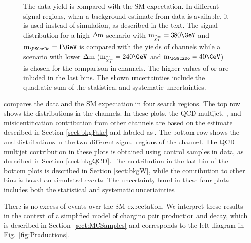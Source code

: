 \begin{figure}[!htb]
\caption{The data yield is compared with the SM expectation. In different signal regions, 
when a background estimate from data is available, it is used instead of simulation, as described in the text. The signal distribution for a high $\Delta \rm{m}$ scenario with $\rm{m}_{\chione}=380\GeV$ and $\rm{m}_{\PSGczDo}=1\GeV$ is compared with the yields of \leptonTau channels while a scenario with lower $\Delta \rm{m}$ ($\rm{m}_{\chione}=240\GeV$ and $\rm{m}_{\PSGczDo}=40\GeV$) is chosen for the comparison in \tauTau channels. The higher values of \mttwo or \SumMT are inluded in the last bins. The shown uncertainties include the quadratic sum of the statistical and systematic uncertainties.}
\label{fig:yield_final}
\end{figure}
compares the data and the SM expectation in four search regions. The top row 
shows the \mttwo distributions in the \leptonTau channels. 
In these plots, the QCD multijet, \wjets, and misidentification \Tau contribution from other channels 
are based on the estimate described in Section \ref{sect:bkgFake} and labeled as \wjets.
The bottom row shows the \mttwo and \SumMT distributions in the two different signal regions of the \tauTau channel. 
The QCD multijet contribution in these plots is obtained using control samples in data, as described in 
Section \ref{sect:bkgQCD}. The \wjets contribution in 
the last bin of the bottom plots is described in Section \ref{sect:bkgW}, while the contribution to other bins is based on simulated events.
The uncertainty band in these four plots includes both the statistical and systematic uncertainties.

There is no excess of events over the SM expectation.  We interpret these results in the context
of a simplified model of chargino pair production and decay, which is described in Section~\ref{sect:MCSamples} and corresponds 
to the left diagram in Fig.~\ref{fig:Productions}. 

